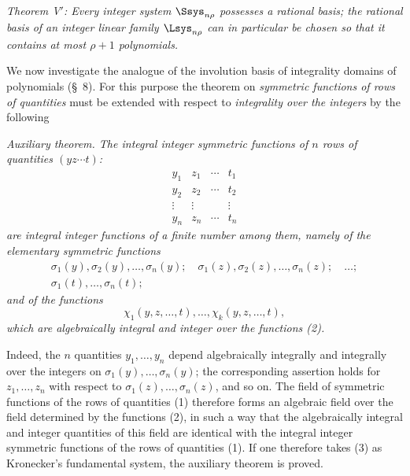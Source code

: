 \documentclass[11pt]{article}
\begin{document}
\emph{Theorem V$'$: Every integer system $\Ssys_{n\rho}$ possesses a rational basis; the rational basis of an integer linear family $\Lsys_{n\rho}$ can in particular be chosen so that it contains at most $\rho+1$ polynomials.}

We now investigate the analogue of the involution basis of integrality domains of polynomials (\S\ 8). For this purpose the theorem on \emph{symmetric functions of rows of quantities} must be extended with respect to \emph{integrality over the integers} by the following

\emph{Auxiliary theorem. The integral integer symmetric functions of $n$ rows of quantities $(yz\cdots t)$:}
\begin{equation}
\begin{array}{cccc}
  y_1&z_1&\cdots&t_1\\
  y_2&z_2&\cdots&t_2\\
  \vdots&\vdots&&\vdots\\
  y_n&z_n&\cdots&t_n
\end{array}
\tag{1}
\end{equation}
\emph{are integral integer functions of a finite number among them, namely of the elementary symmetric functions}
\begin{equation}
\begin{gathered}
  \sigma_1(y),\sigma_2(y),\ldots,\sigma_n(y);\quad
  \sigma_1(z),\sigma_2(z),\ldots,\sigma_n(z);\quad\ldots;\\
  \sigma_1(t),\ldots,\sigma_n(t);
\end{gathered}
\tag{2}
\end{equation}
\emph{and of the functions}
\begin{equation}
  \chi_1(y,z,\ldots,t),\ldots,\chi_k(y,z,\ldots,t),
\tag{3}
\end{equation}
\emph{which are algebraically integral and integer over the functions (2).}

Indeed, the $n$ quantities $y_1,
\ldots,y_n$ depend algebraically integrally and integrally over the integers on $\sigma_1(y),
\ldots,\sigma_n(y)$; the corresponding assertion holds for $z_1,
\ldots,z_n$ with respect to $\sigma_1(z),
\ldots,\sigma_n(z)$, and so on. The field of symmetric functions of the rows of quantities (1) therefore forms an algebraic field over the field determined by the functions (2), in such a way that the algebraically integral and integer quantities of this field are identical with the integral integer symmetric functions of the rows of quantities (1). If one therefore takes (3) as Kronecker's fundamental system, the auxiliary theorem is proved.
\end{document}
